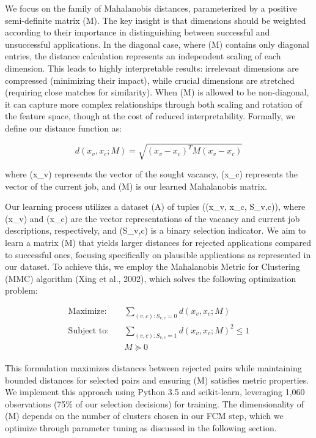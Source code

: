 We focus on the family of Mahalanobis distances, parameterized by a positive semi-definite matrix (M). 
The key insight is that dimensions should be weighted according to their importance in distinguishing between 
successful and unsuccessful applications. In the diagonal case, where (M) contains only diagonal entries, 
the distance calculation represents an independent scaling of each dimension. This leads to highly 
interpretable results: irrelevant dimensions are compressed (minimizing their impact), while crucial 
dimensions are stretched (requiring close matches for similarity). When (M) is allowed to be non-diagonal, 
it can capture more complex relationships through both scaling and rotation of the feature space, though at 
the cost of reduced interpretability. Formally, we define our distance function as:

\begin{equation}
d(x_v, x_c; M) = \sqrt{(x_v - x_c)^T M (x_v - x_c)}
\end{equation}

where (x_v) represents the vector of the sought vacancy, (x_c) represents the vector of the current job, and (M) 
is our learned Mahalanobis matrix.

Our learning process utilizes a dataset (A) of tuples ((x_v, x_c, S_{v,c})), where (x_v) and (x_c) are the vector 
representations of the vacancy and current job descriptions, respectively, and (S_{v,c}) is a binary selection 
indicator. We aim to learn a matrix (M) that yields larger distances for rejected applications compared to 
successful ones, focusing specifically on plausible applications as represented in our dataset. To achieve this, 
we employ the Mahalanobis Metric for Clustering (MMC) algorithm (Xing et al., 2002), which solves the following 
optimization problem:

\begin{align*}
    \text{Maximize:} \quad & \sum_{(v,c): S_{v,c} = 0} d(x_v, x_c; M) \\[1em]
    \text{Subject to:} \quad & \sum_{(v,c): S_{v,c} = 1} d(x_v, x_c; M)^2 \leq 1 \\
    & M \succeq 0
\end{align*}

This formulation maximizes distances between rejected pairs while maintaining bounded distances for selected pairs 
and ensuring 
(M) satisfies metric properties. We implement this approach using Python 3.5 and scikit-learn, 
leveraging 1,060 observations (75\% of our selection decisions) for training. The dimensionality of 
(M) depends on the number of clusters chosen in our FCM step, which we optimize through parameter 
tuning as discussed in the following section.

